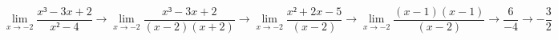 \documentclass[a4paper, 12pt]{article}
\begin{document}
$$ \lim_{x \rightarrow -2} \frac{x³-3x+2}{x²-4} \rightarrow \lim_{x\rightarrow -2} \frac{x³-3x+2}{(x-2)(x+2)}      \rightarrow \lim_{x\rightarrow -2} \frac{x²+2x-5}{(x-2)} \rightarrow  \lim_{x\rightarrow -2} \frac{(x-1)(x-1)}{(x-2)} \rightarrow \frac{6}{-4} \rightarrow -\frac{3}{2} $$
\end{document}
